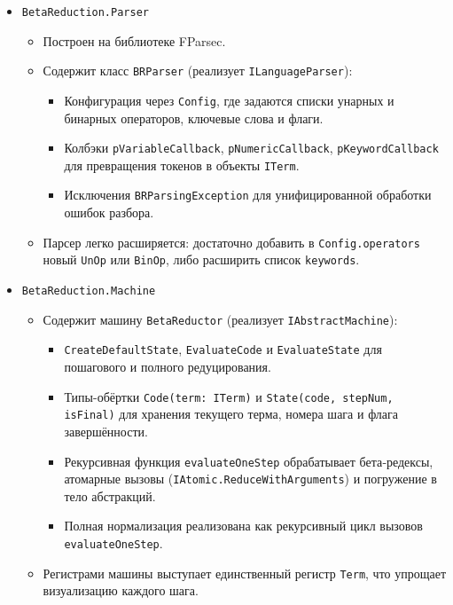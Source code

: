 \begin{itemize}
  \item \texttt{BetaReduction.Parser}  
    \begin{itemize}
      \item Построен на библиотеке FParsec.  
      \item Содержит класс \texttt{BRParser} (реализует \texttt{ILanguageParser}):  
        \begin{itemize}
          \item Конфигурация через \texttt{Config}, где задаются списки унарных и бинарных операторов, ключевые слова и флаги.
          \item Колбэки \texttt{pVariableCallback}, \texttt{pNumericCallback}, \texttt{pKeywordCallback} для превращения токенов в объекты \texttt{ITerm}.
          \item Исключения \texttt{BRParsingException} для унифицированной обработки ошибок разбора.
        \end{itemize}
      \item Парсер легко расширяется: достаточно добавить в \texttt{Config.operators} новый \texttt{UnOp} или \texttt{BinOp}, либо расширить список \texttt{keywords}.
    \end{itemize}

  \item \texttt{BetaReduction.Machine}  
    \begin{itemize}
      \item Содержит машину \texttt{BetaReductor} (реализует \texttt{IAbstractMachine}):  
        \begin{itemize}
          \item \texttt{CreateDefaultState}, \texttt{EvaluateCode} и \texttt{EvaluateState} для пошагового и полного редуцирования.
          \item Типы-обёртки \texttt{Code(term: ITerm)} и \texttt{State(code, stepNum, isFinal)} для хранения текущего терма, номера шага и флага завершённости.
          \item Рекурсивная функция \texttt{evaluateOneStep} обрабатывает бета‑редексы, атомарные вызовы (\texttt{IAtomic.ReduceWithArguments}) и погружение в тело абстракций.
          \item Полная нормализация реализована как рекурсивный цикл вызовов \\\texttt{evaluateOneStep}.
        \end{itemize}
      \item Регистрами машины выступает единственный регистр \texttt{Term}, что упрощает визуализацию каждого шага.
    \end{itemize}


\end{itemize}
